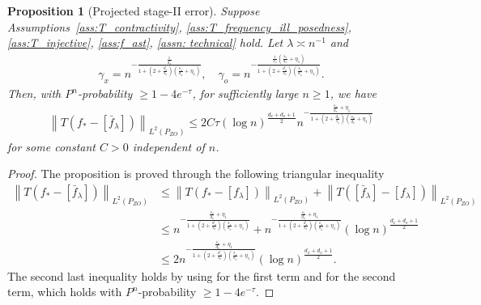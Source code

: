 \documentclass[11pt]{article}
\newcommand{\0}{\mathbf{0}}
\newtheorem{prop}{Proposition}[section]
\begin{document}
\begin{appendix}
\begin{prop}[Projected stage-II error]
\label{prop: projected upper rate}
Suppose Assumptions~\ref{ass:T_contractivity}, \ref{ass:T_frequency_ill_posedness}, \ref{ass:T_injective}, \ref{ass:f_ast}, \ref{assn: technical} hold. Let $\lambda \asymp n^{-1}$ and 
\begin{align*}
    \gamma_x = n^{-\frac{\frac{1}{d_x}}{1+(2+\frac{d_o}{s_o})(\frac{s_x}{d_x}+\eta_1)}}, \quad \gamma_o = n^{-\frac{\frac{1}{s_o}(\frac{s_x}{d_x}+\eta_1)}{1+(2+\frac{d_o}{s_o})(\frac{s_x}{d_x}+\eta_1)}}. 
\end{align*}
Then, with $P^n$-probability $\geq 1-  4e^{-\tau}$, for sufficiently large $n\geq 1$, we have
\begin{align*}
    \left\|T\left(f_{\ast} - \left[\bar{f}_{\lambda}\right]\right)\right\|_{L^2(P_{ZO})} \leq  2C\tau (\log n)^{\frac{d_x+d_o+1}{2}} n^{-\frac{\frac{s_x}{d_x}+\eta_1}{1+(2+\frac{d_o}{s_o})(\frac{s_x}{d_x}+\eta_1)}}
\end{align*}
for some constant $C>0$ independent of $n$.
\end{prop}
\begin{proof}
    The proposition is proved through the following triangular inequality
    \begin{align*}
        \left\|T\left(f_{\ast} - \left[\bar{f}_{\lambda}\right]\right)\right\|_{L^2(P_{ZO})} &\leq \left\|T\left(f_{\ast} - \left[f_{\lambda}\right]\right)\right\|_{L^2(P_{ZO})} + \left\|T\left(\left[\bar{f}_{\lambda}\right] - [f_{\lambda}]\right)\right\|_{L^2(P_{ZO})} \\
        &\leq n^{-\frac{\frac{s_x}{d_x}+\eta_1}{1+(2+\frac{d_o}{s_o})(\frac{s_x}{d_x}+\eta_1)}} + n^{-\frac{\frac{s_x}{d_x}+\eta_1}{1+(2+\frac{d_o}{s_o})(\frac{s_x}{d_x}+\eta_1)}} (\log n)^{\frac{d_x+d_o+1}{2}} \\
        &\leq 2 n^{-\frac{\frac{s_x}{d_x}+\eta_1}{1+(2+\frac{d_o}{s_o})(\frac{s_x}{d_x}+\eta_1)}} (\log n)^{\frac{d_x+d_o+1}{2}}.
    \end{align*}
    The second last inequality holds by using  for the first term and  for the second term, which holds with $P^n$-probability $\geq 1-  4e^{-\tau}$.
\end{proof}


\end{appendix}
\end{document}
